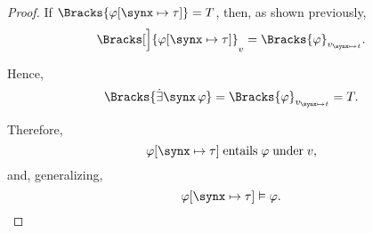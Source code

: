 \begin{proof}
   If \( \Bracks{\varphi[\synx \mapsto \tau]} = T \), then, as shown previously,
  \begin{equation*}
    \Bracks[\Big]{\varphi[\synx \mapsto \tau]}_v = \Bracks{\varphi}_{v_{\synx \mapsto t}}.
  \end{equation*}

  Hence,
  \begin{equation*}
    \Bracks{\qexists \synx \varphi} = \Bracks{\varphi}_{v_{\synx \mapsto t}} = T.
  \end{equation*}

  Therefore,
  \begin{equation*}
    \varphi[\synx \mapsto \tau] \T{entails} \varphi \T{under} v,
  \end{equation*}
  and, generalizing,
  \begin{equation*}
    \varphi[\synx \mapsto \tau] \vDash \varphi.
  \end{equation*}
\end{proof}

